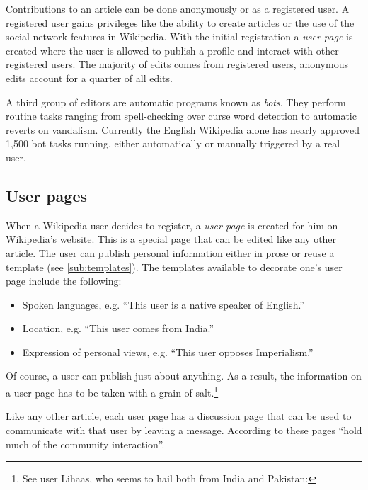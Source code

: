 Contributions to an article can be done anonymously or as a registered user.
A registered user gains privileges like the ability to create articles or the use of the social network features in Wikipedia.
With the initial registration a \emph{user page} is created where the user is allowed to publish a profile and interact with other registered users.\cite{wikiwhyaccount}
The majority of edits comes from registered users, anonymous edits account for a quarter of all edits.\cite{wpanonstats}

A third group of editors are automatic programs known as \emph{bots}.
They perform routine tasks ranging from spell-checking over curse word detection to automatic reverts on vandalism.
Currently the English Wikipedia alone has nearly approved 1,500 bot tasks running, either automatically or manually triggered by a real user.\cite{wpbots}

\subsection{User pages}\label{sub:userpages}

When a Wikipedia user decides to register, a \emph{user page} is created for him on Wikipedia's website. 
This is a special page that can be edited like any other article.
The user can publish personal information either in prose or reuse a template (see \ref{sub:templates}).
The templates available to decorate one's user page include the following: 
\begin{itemize}
  \item Spoken languages, e.g. ``This user is a native speaker of English.''
  \item Location, e.g. ``This user comes from India.''
  \item Expression of personal views, e.g. ``This user opposes Imperialism.''
\end{itemize}
Of course, a user can publish just about anything.
As a result, the information on a user page has to be taken with a grain of salt.\footnote{See user Lihaas, who seems to hail both from India and Pakistan: }

Like any other article, each user page has a discussion page that can be used to communicate with that user by leaving a message.
According to \textcite{Viegas2007talk} these pages ``hold much of the community interaction''.


